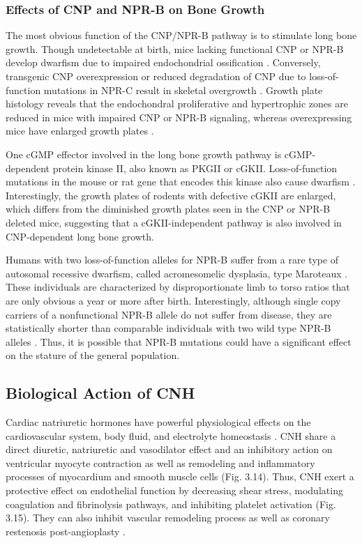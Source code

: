 \documentclass[14pt,a4paper,onecolumn]{extarticle}
\begin{document}
\subsubsection{Effects of CNP and NPR-B on Bone Growth}
The most obvious function of the CNP/NPR-B pathway is to stimulate long bone growth. Though undetectable at birth, mice lacking functional CNP or NPR-B develop dwarfism due to impaired endochondrial ossification \citep{Chusho2001} \citep{Tamura2001} \citep{Tsuji2005}.
Conversely, transgenic CNP overexpression or reduced degradation of CNP due to loss-of-function mutations in NPR-C result in skeletal overgrowth \citep{Jaubert1999} \citep{Matsukawa1999}  \citep{Yasoda2004}. Growth plate histology reveals that the endochondral proliferative and hypertrophic zones are reduced in mice with impaired CNP or NPR-B signaling, whereas overexpressing mice have enlarged growth plates \citep{Chusho2001} \citep{Tamura2004} \citep{Yasoda2004}.

One cGMP effector involved in the long bone growth pathway is cGMP-dependent protein kinase II, also known as PKGII or cGKII. Loss-of-function mutations in the mouse or rat gene that encodes this kinase also cause dwarfism \citep{Chikuda2004} \citep{Pfeifer1996}. Interestingly, the growth plates of rodents with defective cGKII are enlarged, which differs from the diminished growth plates seen in the CNP or NPR-B deleted mice, suggesting that a cGKII-independent pathway is also involved in CNP-dependent long bone growth.

Humans with two loss-of-function alleles for NPR-B suffer from a rare type of autosomal recessive dwarfism, called acromesomelic dysplasia, type Maroteaux \citep{Bartels2004}. These individuals are characterized by disproportionate limb to torso ratios that are only obvious a year or more after birth. Interestingly, although single copy carriers of a nonfunctional NPR-B allele do not suffer from disease, they are statistically shorter than comparable individuals with two wild type NPR-B alleles \citep{Olney2006}. Thus, it is possible that NPR-B mutations could have a significant effect on the stature of the general population.

\subsection{Biological Action of CNH }

Cardiac natriuretic hormones have powerful physiological effects on the cardiovascular system, body fluid, and electrolyte homeostasis \citep{13} \citep{28} \citep{30} \citep{77} \citep{78}. CNH share a direct diuretic, natriuretic and vasodilator effect and an inhibitory action on ventricular myocyte contraction \citep{79} as well as remodeling and inflammatory processes of myocardium and smooth muscle cells \citep{80} \citep{81} \citep{82} \citep{83} (Fig. 3.14). Thus, CNH exert a protective effect on endothelial function by decreasing shear stress, modulating coagulation and fibrinolysis pathways, and inhibiting platelet activation (Fig. 3.15). They can also inhibit vascular remodeling process as well as coronary restenosis post-angioplasty \citep{56} \citep{84} \citep{85} \citep{86} \citep{87} \citep{88} \citep{89}.
\end{document}
